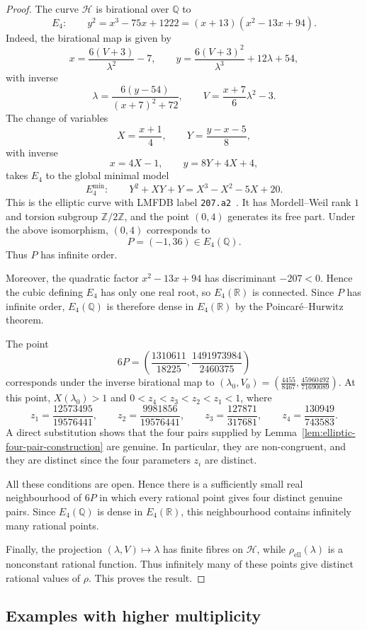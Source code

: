 \documentclass[11pt]{amsart}
\theoremstyle{plain}
\theoremstyle{remark}
\theoremstyle{plain}
\newcommand{\Q}{\mathbb{Q}}
\newcommand{\Z}{\mathbb{Z}}
\newcommand{\R}{\mathbb{R}}
\begin{document}
\begin{proof}
The curve $\mathcal H$ is birational over $\Q$ to
\[
E_4:\qquad
y^2=x^3-75x+1222
=(x+13)(x^2-13x+94).
\]
Indeed, the birational map is given by
\[
x=\frac{6(V+3)}{\lambda^2}-7,
\qquad
y=\frac{6(V+3)^2}{\lambda^3}+12\lambda+54,
\]
with inverse
\[
\lambda=
\frac{6(y-54)}{(x+7)^2+72},
\qquad
V=\frac{x+7}{6}\lambda^2-3.
\]
The change of variables
\[
X=\frac{x+1}{4},
\qquad
Y=\frac{y-x-5}{8},
\]
with inverse
\[
x=4X-1,
\qquad
y=8Y+4X+4,
\]
takes $E_4$ to the global minimal model
\[
E_4^{\min}:\qquad
Y^2+XY+Y=X^3-X^2-5X+20.
\]
This is the elliptic curve with LMFDB label
\texttt{207.a2}~\cite{lmfdb}. It has Mordell--Weil rank $1$ and
torsion subgroup $\Z/2\Z$, and the point $(0,4)$ generates its free
part. Under the above isomorphism, $(0,4)$ corresponds to
\[
P=(-1,36)\in E_4(\Q).
\]
Thus $P$ has infinite order.


Moreover, the quadratic factor
$x^2-13x+94$
has discriminant $-207<0$. Hence the cubic defining $E_4$ has only
one real root, so $E_4(\R)$ is connected. Since $P$ has infinite
order, $E_4(\Q)$ is therefore dense in $E_4(\R)$ by the
Poincar\'e--Hurwitz theorem.

The point
\[
6P=
\left(
\frac{1310611}{18225},
\frac{1491973984}{2460375}
\right)
\]
corresponds under the inverse birational map to
$(\lambda_0,V_0)=\left(\frac{4455}{8467}, \frac{45960492}{71690089}\right)$.
At this point,
$X(\lambda_0)>1$
and
$0<z_4<z_3<z_2<z_1<1$,
where
\[
z_1=\frac{12573495}{19576441},
\qquad
z_2=\frac{9981856}{19576441},
\qquad
z_3=\frac{127871}{317681},
\qquad
z_4=\frac{130949}{743583}.
\]
A direct substitution shows that the four pairs supplied by
Lemma~\ref{lem:elliptic-four-pair-construction} are genuine.
In particular, they are non-congruent, and they are distinct since
the four parameters $z_i$ are distinct.

All these conditions are open. Hence there is a sufficiently small
real neighbourhood of $6P$ in which every rational point gives four
distinct genuine pairs. Since $E_4(\Q)$ is dense in $E_4(\R)$, this
neighbourhood contains infinitely many rational points.

Finally, the projection
$(\lambda,V)\longmapsto\lambda$
has finite fibres on $\mathcal H$, while
$\rho_{\mathrm{ell}}(\lambda)$ is a nonconstant rational function.
Thus infinitely many of these points give distinct rational values of
$\rho$. This proves the result.
\end{proof}

\subsection{Examples with higher multiplicity}
\end{document}
